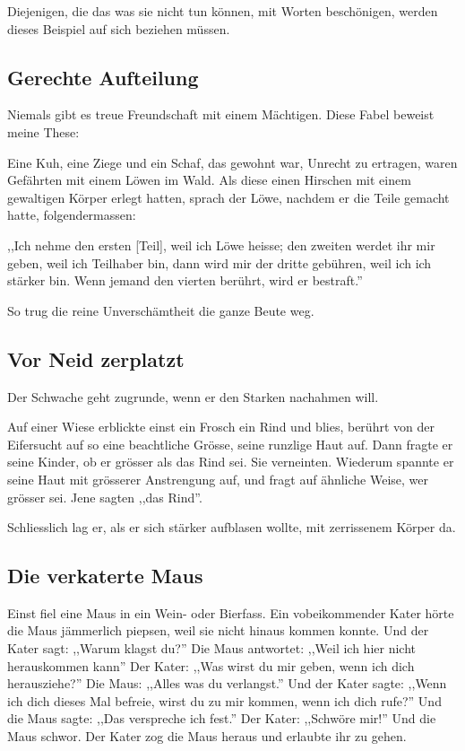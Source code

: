 \documentclass[a4paper]{article}
\begin{document}
Diejenigen, die das was sie nicht tun können, mit Worten beschönigen, werden dieses Beispiel auf sich beziehen müssen.

\subsection{Gerechte Aufteilung}
Niemals gibt es treue Freundschaft mit einem Mächtigen. Diese Fabel beweist meine These:

Eine Kuh, eine Ziege und ein Schaf, das gewohnt war, Unrecht zu ertragen, waren Gefährten mit einem Löwen im Wald. Als diese einen Hirschen mit einem gewaltigen Körper erlegt hatten, sprach der Löwe, nachdem er die Teile gemacht hatte, folgendermassen:

,,Ich nehme den ersten [Teil], weil ich Löwe heisse; den zweiten werdet ihr mir geben, weil ich Teilhaber bin, dann wird mir der dritte gebühren, weil ich ich stärker bin. Wenn jemand den vierten berührt, wird er bestraft.''

So trug die reine Unverschämtheit die ganze Beute weg.

\subsection{Vor Neid zerplatzt}
Der Schwache geht zugrunde, wenn er den Starken nachahmen will.

Auf einer Wiese erblickte einst ein Frosch ein Rind und blies, berührt von der Eifersucht auf so eine beachtliche Grösse, seine runzlige Haut auf. Dann fragte er seine Kinder, ob er grösser als das Rind sei. Sie verneinten. Wiederum spannte er seine Haut mit grösserer Anstrengung auf, und fragt auf ähnliche Weise, wer grösser sei. Jene sagten ,,das Rind''.

Schliesslich lag er, als er sich stärker aufblasen wollte, mit zerrissenem Körper da.

\subsection{Die verkaterte Maus}
Einst fiel eine Maus in ein Wein- oder Bierfass. Ein vobeikommender Kater hörte die Maus jämmerlich piepsen, weil sie nicht hinaus kommen konnte. Und der Kater sagt: ,,Warum klagst du?'' Die Maus antwortet: ,,Weil ich hier nicht herauskommen kann'' Der Kater: ,,Was wirst du mir geben, wenn ich dich herausziehe?'' Die Maus: ,,Alles was du verlangst.'' Und der Kater sagte: ,,Wenn ich dich dieses Mal befreie, wirst du zu mir kommen, wenn ich dich rufe?'' Und die Maus sagte: ,,Das verspreche ich fest.'' Der Kater: ,,Schwöre mir!'' Und die Maus schwor. Der Kater zog die Maus heraus und erlaubte ihr zu gehen.  
\end{document}
